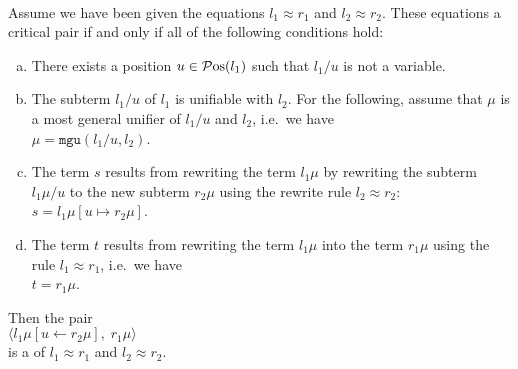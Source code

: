 \begin{Definition} \hspace*{\fill} \\
  Assume we have been given the equations $l_1 \approx r_1$ and $l_2 \approx r_2$.  These equations
   a critical pair if and only if all of the following conditions hold:
  \begin{enumerate}[(a)]
  \item There exists a position $u \in \mathcal{P}\mathrm{os}(l_1)$ such that $l_1/u$ is not a variable.
  \item The subterm $l_1/u$ of $l_1$ is unifiable with $l_2$.  For the following, assume that $\mu$ is a most general unifier
        of $l_1/u$ and $l_2$, i.e.~we have
        \\[0.2cm]
        \hspace*{1.3cm}
        $\mu = \texttt{mgu}(l_1/u, l_2)$.
  \item The term $s$ results from rewriting the term $l_1\mu$ by rewriting the subterm $l_1\mu/u$
        to the new subterm $r_2\mu$ using the rewrite rule $l_2 \approx r_2$:      
        \\[0.2cm]
        \hspace*{1.3cm}
        $s = l_1\mu[u \mapsto r_2\mu]$.
  \item The term $t$ results from rewriting the term $l_1\mu$ into the term $r_1\mu$ using the rule
        $l_1 \approx r_1$, i.e.~we have
        \\[0.2cm]
        \hspace*{1.3cm}
        $t = r_1\mu$.  
      \end{enumerate}
      Then the pair
      \\[0.2cm]
      \hspace*{1.3cm}
      $\bigl\langle l_1\mu[u \leftarrow r_2\mu],\; r_1\mu \bigr\rangle$
      \\[0.2cm]
      is a  of $l_1 \approx r_1$ and $l_2 \approx r_2$. \eod
\end{Definition}

